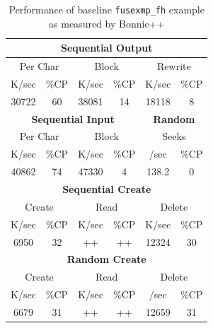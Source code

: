 \begin{table}[Ht]
\centering
\begin{tabular}{| c | c | c | c | c | c |}
\hline
\multicolumn{6}{|c|}{\bf Sequential Output}\\
\hline
\multicolumn{2}{|c|}{Per Char} &
\multicolumn{2}{c|}{Block} &
\multicolumn{2}{c|}{Rewrite} \\
\hline
K/sec & \%CP & K/sec & \%CP & K/sec & \%CP \\
\hline
30722& 60 & 38081 & 14 & 18118 & 8 \\
\hline

\multicolumn{4}{|c|}{\bf Sequential Input} & \multicolumn{2}{c|}{\bf Random}\\
\hline
\multicolumn{2}{|c|}{Per Char} &
\multicolumn{2}{c|}{Block} &
\multicolumn{2}{c|}{Seeks} \\
\hline
K/sec & \%CP & K/sec & \%CP & /sec & \%CP \\
\hline
40862 & 74 & 47330 & 4 & 138.2 & 0 \\
\hline

\multicolumn{6}{|c|}{\bf Sequential Create}\\
\hline
\multicolumn{2}{|c|}{Create} &
\multicolumn{2}{c|}{Read} &
\multicolumn{2}{c|}{Delete} \\
\hline
K/sec & \%CP & K/sec & \%CP & K/sec & \%CP \\
\hline
6950 & 32 & ++ & ++ & 12324 & 30 \\
\hline

\multicolumn{6}{|c|}{\bf Random Create}\\
\hline
\multicolumn{2}{|c|}{Create} &
\multicolumn{2}{c|}{Read} &
\multicolumn{2}{c|}{Delete} \\
\hline
K/sec & \%CP & K/sec & \%CP & /sec & \%CP \\
\hline
6679 & 31 & ++ & ++ & 12659 & 31 \\
\hline
\end{tabular}
\caption{Performance of baseline \texttt{fusexmp\_fh} example as measured by Bonnie++}
\label{tab:bonnie-fusexmp_fh}
\end{table}





